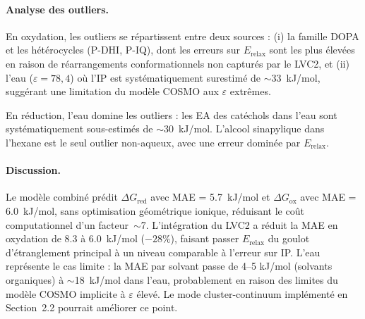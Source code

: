 \paragraph{Analyse des outliers.}
En oxydation, les outliers se répartissent entre deux sources : (i) la famille DOPA et les hétérocycles (P-DHI, P-IQ), dont les erreurs sur $E_\text{relax}$ sont les plus élevées en raison de réarrangements conformationnels non capturés par le LVC2, et (ii) l'eau ($\varepsilon = 78{,}4$) où l'IP est systématiquement surestimé de $\sim$\SI{33}{kJ/mol}, suggérant une limitation du modèle COSMO aux $\varepsilon$ extrêmes.

En réduction, l'eau domine les outliers : les EA des catéchols dans l'eau sont systématiquement sous-estimés de $\sim$\SI{30}{kJ/mol}. L'alcool sinapylique dans l'hexane est le seul outlier non-aqueux, avec une erreur dominée par $E_\text{relax}$.

\paragraph{Discussion.}
Le modèle combiné prédit $\Delta G_\text{red}$ avec MAE = \SI{5.7}{kJ/mol} et $\Delta G_\text{ox}$ avec MAE = \SI{6.0}{kJ/mol}, sans optimisation géométrique ionique, réduisant le coût computationnel d'un facteur~$\sim$7. L'intégration du LVC2 a réduit la MAE en oxydation de \SI{8.3}{} à \SI{6.0}{kJ/mol} ($-28\%$), faisant passer $E_\text{relax}$ du goulot d'étranglement principal à un niveau comparable à l'erreur sur IP. L'eau représente le cas limite : la MAE par solvant passe de 4--5 kJ/mol (solvants organiques) à $\sim$\SI{18}{kJ/mol} dans l'eau, probablement en raison des limites du modèle COSMO implicite à $\varepsilon$ élevé. Le mode cluster-continuum implémenté en Section~2.2 pourrait améliorer ce point.

